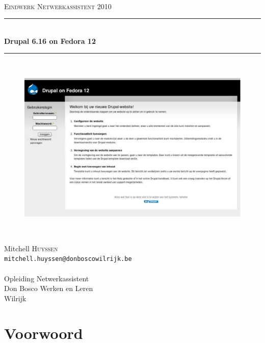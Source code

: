 \documentclass[11pt,twoside,onecolumn,titlepage,openbib]{book}
\newcommand{\HRule}{\rule{\linewidth}{0.5mm}}
\begin{document}
\frontmatter

\begin{titlepage}
\begin{center}
\textsc{\Large }\\[1.5cm]
\textsc{\Large Eindwerk Netwerkassistent 2010}\\[0.5cm]
\HRule \\[0.8cm]
{ \huge \bfseries Drupal 6.16 on Fedora 12}\\[0.4cm]
\HRule \\[1.5cm]
 \begin{figure}[!t]
    \centering
   \includegraphics[scale=0.4]{drupal_on_F12_login}
 \end{figure}
\textsc{\Large }\\[2.5cm]
\begin{minipage}{0.4\textwidth}
\begin{center} 
\large Mitchell \textsc{Huyssen}\\
\texttt{mitchell.huyssen@donboscowilrijk.be}\\
\texttt{ }\\
Opleiding Netwerkassistent\\
Don Bosco Werken en Leren\\
Wilrijk
\end{center}
\end{minipage}
\vfill
\end{center}
\end{titlepage}




\tableofcontents
\listoffigures
\newpage
\chapter*{Voorwoord}

\end{document}
